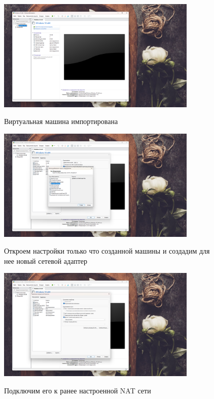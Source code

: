 \documentclass[a4paper]{article}
\begin{document}
  \begin{figure}[H]
    \centering
    \includegraphics[width=0.85\textwidth]{06_00 (9)}
    \label{img:9}
    \caption{Виртуальная машина импортирована}
  \end{figure}
  
  \begin{figure}[H]
    \centering
    \includegraphics[width=0.85\textwidth]{06_00 (10)}
    \label{img:10}
    \caption{Откроем настройки только что созданной машины и создадим для нее новый сетевой адаптер}
  \end{figure}
  
  \begin{figure}[H]
    \centering
    \includegraphics[width=0.85\textwidth]{06_00 (11)}
    \label{img:11}
    \caption{Подключим его к ранее настроенной NAT сети}
  \end{figure}
  
\end{document}
